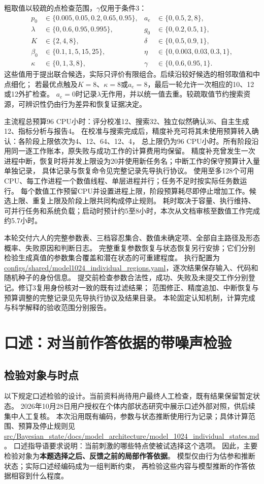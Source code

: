 \documentclass[11pt,a4paper]{article}
\numberwithin{equation}{section}
\begin{document}
粗取值以较疏的点检查范围，$\gamma$仅用于条件3：
\[
\begin{aligned}
p_0&\in\{0.005,0.05,0.2,0.65,0.95\}, & a_e&\in\{0,0.5,2,8\},\\
\lambda&\in\{0,0.6,0.95,0.995\}, & g_0&\in\{0,0.2,0.5,1\},\\
K&\in\{2,4,8\}, & \delta&\in\{0,0.5,0.9,1\},\\
\beta_0&\in\{0.1,1,5,15,25\}, & \eta&\in\{0,0.003,0.03,0.3,1\},\\
\kappa&\in\{0,1,3,8\}, & \gamma&\in\{0,0.6,0.95,1\}.
\end{aligned}
\]
这些值用于提出联合候选，实际只评价有限组合。后续沿较好候选的相邻取值和中点细化；
若最优点触及$K=8$、$\kappa=8$或$a_e=8$，最后一轮允许一次相应的10、12或12外扩检查。
$a_e=0$时记录$\lambda$无作用，并以统一值去重。较疏取值节约搜索资源，可辨识性仍由行为差异和恢复证据决定。

主流程总预算96 CPU小时：评分校准12、搜索32、独立似然确认36、自主生成12、指标分析与报告4。
在校准与搜索完成后，精度补充可将其未使用预算转入确认：各阶段上限依次为4、12、64、12、4，
总上限仍为96 CPU小时。所有阶段沿用同一逐工作账本，原失败与成功工作的计算费用均保留。
精度补充曾发生一次进程中断，恢复时将并发上限设为20并使用新任务名；中断工作的保守预算计入量单独记录，
具体记录与恢复命令见完整记录先导执行协议。
使用至多128个可用CPU、每工作进程一个数值线程、单层进程并行；任务不足时按实际任务数运行。
每个数值工作预留CPU并设置进程上限，阶段预算耗尽即停止增加工作。候选上限、重复上限及阶段上限共同构成停止规则。
耗时取决于容量、执行维持、可并行任务和系统负载；启动时预计约5至8小时，本次从文档审核至数值工作完成约5.7小时。

本轮交付六人的完整参数表、三档容忍集合、数值未确定项、全部自主路径及形态概率、失败原因和判断日志。
完整重复参数恢复与状态恢复另行安排；它们分别检验生成真值的参数集合覆盖和潜在状态的可重建程度。
执行配置为\url{configs/shared/model1024_individual_regions.yaml}，逐次结果保存输入、代码和随机种子的身份信息。
提交前检查参数合法性，成功、失败及未提交工作分别登记。修订3复用身份核对一致的既有过滤结果；
范围修正、精度追加、中断恢复与预算调整的完整记录见先导执行协议及结果目录。
本轮固定认知机制，计算完成与科学解释的验收范围分别报告。

\section{口述：对当前作答依据的带噪声检验}
\label{sec:oral}

\subsection{检验对象与时点}
以下规定口述检验的设计。当前资料尚待用户最终人工检查，既有结果保留暂定状态。
2026年10月28日用户授权在个体内部状态研究中展示口述外部对照，供后续集中人工复核。
本次沿用既有编码，参数与状态推断使用行为记录；具体计算范围、预算及停止规则见
\url{src/Bayesian_state/docs/model_architecture/model_1024_individual_states.md}。
口述指导语要求说明：当前刺激的哪些特点使被试选择这个选项。
因此，主要检验对象为\textbf{本题选择之后、反馈之前的局部作答依据}。
模型仅由行为估参和推断状态；实际口述经编码成为一组判断约束，
再检验这些内容与模型推断的作答依据相容到什么程度。
\end{document}
